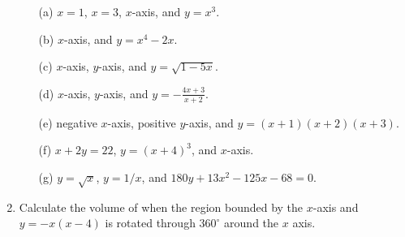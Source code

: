 \documentclass{article}
\begin{document}
\begin{enumerate}
\begin{itemize}
              \item[(a)] $x=1$, $x=3$, $x$-axis, and $y=x^3$.
              \item[(b)] $x$-axis, and $y=x^4-2x$.
              \item[(c)] $x$-axis, $y$-axis, and $y=\sqrt{1-5x}$.
              \item[(d)] $x$-axis, $y$-axis, and $y=-\frac{4x+3}{x+2}$.
              \item[(e)] negative $x$-axis, positive $y$-axis, and $y=(x+1)(x+2)(x+3)$.
              \item[(f)] $x+2y=22$, $y=(x+4)^3$, and $x$-axis.
              \item[(g)] $y=\sqrt{x}$, $y=1/x$, and $180y+13x^2-125x-68=0$.
       \end{itemize}
\item Calculate the volume of when the region bounded by the $x$-axis and $y=-x(x-4)$ is rotated through $360^\circ$ around the $x$ axis.
\end{enumerate}
\end{document}
